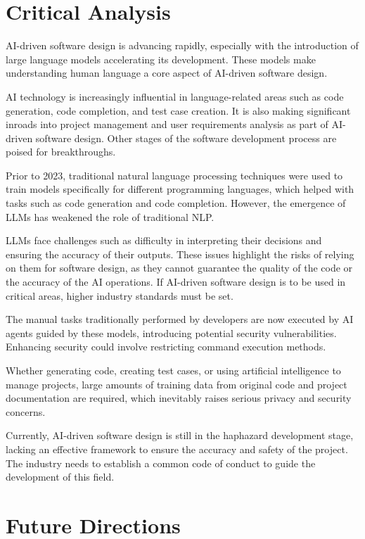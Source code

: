 \documentclass{article}
\begin{document}
\section{Critical Analysis}
\label{sec:conc}
AI-driven software design is advancing rapidly, especially with the introduction of large language models accelerating 
its development. These models make understanding human language a core aspect of AI-driven software design. 

AI technology is increasingly influential in language-related areas such as code generation, code completion, and test case creation. 
It is also making significant inroads into project management and user requirements analysis as part of AI-driven software design. 
Other stages of the software development process are poised for breakthroughs.

Prior to 2023, traditional natural language processing techniques were used to train models specifically for different programming 
languages, which helped with tasks such as code generation and code completion. However, the emergence of LLMs has weakened the 
role of traditional NLP. 

LLMs face challenges such as difficulty in interpreting their decisions and ensuring the accuracy of their 
outputs. These issues highlight the risks of relying on them for software design, as they cannot guarantee the quality of the 
code or the accuracy of the AI operations. If AI-driven software design is to be used in critical areas, higher industry 
standards must be set. 

The manual tasks traditionally performed by developers are now executed by AI agents guided by these models, introducing 
potential security vulnerabilities. Enhancing security could involve restricting command execution methods.

Whether generating code, creating test cases, or using artificial intelligence to manage projects, large amounts of training data 
from original code and project documentation are required, which inevitably raises serious privacy and security concerns. 

Currently, AI-driven software design is still in the haphazard development stage, lacking an effective framework to ensure the 
accuracy and safety of the project. The industry needs to establish a common code of conduct to guide the development of this 
field.



\section{Future Directions}
\end{document}
